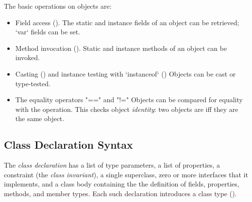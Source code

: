 The basic operations on objects are:
\begin{itemize}

{}\item Field access (). 
The static and instance fields of an object can be retrieved; \xcd`var` fields
can be set.  

{}\item Method invocation ().  
Static and instance methods of an object can be invoked.

{}\item Casting () and instance testing with \xcd`instanceof`
() Objects can be cast or type-tested.  

\item The equality operators \xcd"==" and \xcd"!="
Objects can be compared for equality with the \Xcd{==} operation.  This checks
object {\em identity}: two objects are \Xcd{==} iff they are the same object.

\end{itemize}

  
 
\subsection{Class Declaration Syntax}

The {\em class declaration} has a list of type parameters, a list of
properties, a constraint (the {\em class invariant}), a single superclass,
zero or more interfaces that it implements, and a class body containing the
the definition of fields, properties, methods, and member types. Each such
declaration introduces a class type ().

